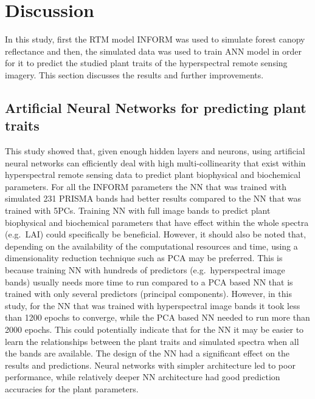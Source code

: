 \documentclass[a4paper, twoside]{templates/ociamthesis}
\begin{document}
\hypertarget{discussion}{%
\chapter{Discussion}\label{discussion}}

In this study, first the RTM model INFORM was used to simulate forest canopy reflectance and then, the simulated data was used to train ANN model in order for it to predict the studied plant traits of the hyperspectral remote sensing imagery. This section discusses the results and further improvements.

\hypertarget{artificial-neural-networks-for-predicting-plant-traits}{%
\section{Artificial Neural Networks for predicting plant traits}\label{artificial-neural-networks-for-predicting-plant-traits}}

This study showed that, given enough hidden layers and neurons, using artificial neural networks can efficiently deal with high multi-collinearity that exist within hyperspectral remote sensing data to predict plant biophysical and biochemical parameters. For all the INFORM parameters the NN that was trained with simulated 231 PRISMA bands had better results compared to the NN that was trained with 5PCs. Training NN with full image bands to predict plant biophysical and biochemical parameters that have effect within the whole spectra (e.g.~LAI) could specifically be beneficial. However, it should also be noted that, depending on the availability of the computational resources and time, using a dimensionality reduction technique such as PCA may be preferred. This is because training NN with hundreds of predictors (e.g.~hyperspectral image bands) usually needs more time to run compared to a PCA based NN that is trained with only several predictors (principal components). However, in this study, for the NN that was trained with hyperspectral image bands it took less than 1200 epochs to converge, while the PCA based NN needed to run more than 2000 epochs. This could potentially indicate that for the NN it may be easier to learn the relationships between the plant traits and simulated spectra when all the bands are available. The design of the NN had a significant effect on the results and predictions. Neural networks with simpler architecture led to poor performance, while relatively deeper NN architecture had good prediction accuracies for the plant parameters.
\end{document}
